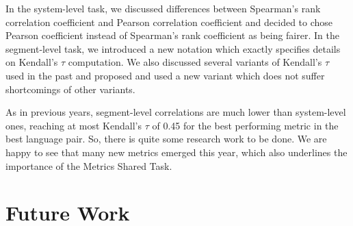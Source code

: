 In the system-level task, we discussed differences between Spearman's rank
correlation coefficient and Pearson correlation coefficient and decided to
chose Pearson coefficient instead of Spearman's rank coefficient as being
fairer. In the segment-level task, we introduced a new notation which exactly
specifies details on Kendall's $\tau$ computation. We also discussed several
variants of Kendall's $\tau$ used in the past and proposed and used a new
variant which does not suffer shortcomings of other variants.

As in previous years, segment-level correlations are much lower than
system-level ones, reaching at most Kendall's $\tau$ of 0.45 for the best
performing metric in the best language pair. So, there is quite some research
work to be done. We are happy to see that many new metrics emerged this year,
which also underlines the importance of the Metrics Shared Task.




\section{Future Work}

